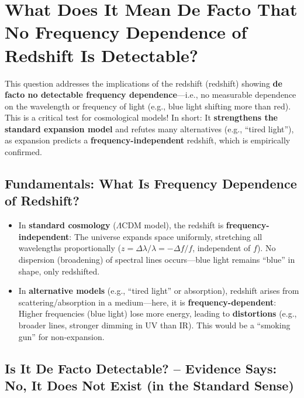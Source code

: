 	\section{What Does It Mean De Facto That No Frequency Dependence of Redshift Is Detectable?}
	
	This question addresses the implications of the redshift (redshift) showing \textbf{de facto no detectable frequency dependence}—i.e., no measurable dependence on the wavelength or frequency of light (e.g., blue light shifting more than red). This is a critical test for cosmological models! In short: It \textbf{strengthens the standard expansion model} and refutes many alternatives (e.g., ``tired light''), as expansion predicts a \textbf{frequency-independent} redshift, which is empirically confirmed.
	
	\subsection{Fundamentals: What Is Frequency Dependence of Redshift?}
	
	\begin{itemize}
		\item In \textbf{standard cosmology} ($\Lambda$CDM model), the redshift is \textbf{frequency-independent}: The universe expands space uniformly, stretching all wavelengths proportionally ($z = \Delta\lambda/\lambda = -\Delta f/f$, independent of $f$). No dispersion (broadening) of spectral lines occurs—blue light remains ``blue'' in shape, only redshifted.
		\item In \textbf{alternative models} (e.g., ``tired light'' or absorption), redshift arises from scattering/absorption in a medium—here, it is \textbf{frequency-dependent}: Higher frequencies (blue light) lose more energy, leading to \textbf{distortions} (e.g., broader lines, stronger dimming in UV than IR). This would be a ``smoking gun'' for non-expansion.
	\end{itemize}
	
	\subsection{Is It De Facto Detectable? – Evidence Says: No, It Does Not Exist (in the Standard Sense)}
	
